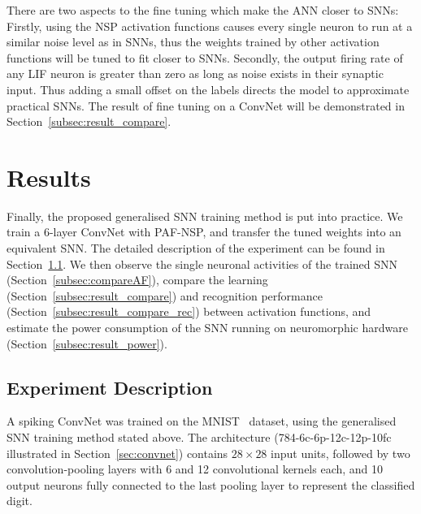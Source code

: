 	
	There are two aspects to the fine tuning which make the ANN closer to SNNs:
	Firstly, using the NSP activation functions causes every single neuron to run at a similar noise level as in SNNs, thus the weights trained by other activation functions will be tuned to fit closer to SNNs.
	Secondly, the output firing rate of any LIF neuron is greater than zero as long as noise exists in their synaptic input.
	Thus adding a small offset on the labels directs the model to approximate practical SNNs. 
	The result of fine tuning on a ConvNet will be demonstrated in Section~\ref{subsec:result_compare}.
	
\section{Results}
\label{sec:iconipResult}
	Finally, the proposed generalised SNN training method is put into practice.
	We train a 6-layer ConvNet with PAF-NSP, and transfer the tuned weights into an equivalent SNN.
	The detailed description of the experiment can be found in Section~\ref{subsec:expDesr}.
	We then observe the single neuronal activities of the trained SNN (Section~\ref{subsec:compareAF}), compare the learning (Section~\ref{subsec:result_compare}) and recognition performance (Section~\ref{subsec:result_compare_rec}) between activation functions, and estimate the power consumption of the SNN running on neuromorphic hardware (Section~\ref{subsec:result_power}).  
	 
	\subsection{Experiment Description}
	\label{subsec:expDesr}
	A spiking ConvNet was trained on the MNIST~\citep{lecun1998gradient} dataset, 
	using the generalised SNN training method stated above.
	The architecture (784-6c-6p-12c-12p-10fc illustrated in Section~\ref{sec:convnet}) contains $28\times28$ input units, followed by two convolution-pooling layers with 6 and 12 convolutional kernels each, and 10 output neurons fully connected to the last pooling layer to represent the classified digit.
	

